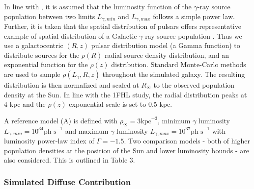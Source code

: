 \documentclass{PoS}
\begin{document}
In line with \cite{Strong}, it is assumed that the luminosity function of the $\gamma$-ray source population between two limits $L_{\gamma, min}$ and $L_{\gamma, max}$ follows a simple power law. Further, it is taken that the spatial distribution of pulsars offers representative example of spatial distribution of a Galactic $\gamma$-ray source population \cite[p.2]{Strong}. Thus we use a galactocentric $(R, z)$ pulsar distribution model \cite[p.7]{Lorimer} (a Gamma function) to distribute sources for the $\rho(R)$ radial source density distribution, and an exponential function for the $\rho(z)$ distribution. Standard Monte-Carlo methods are used to sample $\rho(L_{\gamma}, R, z)$ throughout the simulated galaxy. The resulting distribution is then normalized and scaled at $R_{\astrosun}$ to the observed population density at the Sun. In line with the 1FHL study, the radial distribution peaks at 4 kpc and the $\rho(z)$ exponential scale is set to 0.5 kpc.

A reference model (A) is defined with $\rho_{\astrosun} = 3 \text{kpc}^{-3}$, minimum $\gamma$ luminosity $L_{\gamma, min} = 10^{34} \text{ph s}^{-1}$ and maximum $\gamma$ luminosity $L_{\gamma, max} = 10^{37} \text{ph s}^{-1}$ with luminosity power-law index of $\Gamma=-1.5$. Two comparison models - both of higher population densities at the position of the Sun and lower luminosity bounds - are also considered. This is outlined in Table 3.

\begin{table}
\centering
{}
\caption{Parameters for 10 - 500 GeV Galaxy Population Simulations.}
\end{table}

\subsubsection{Simulated Diffuse Contribution}
\end{document}
